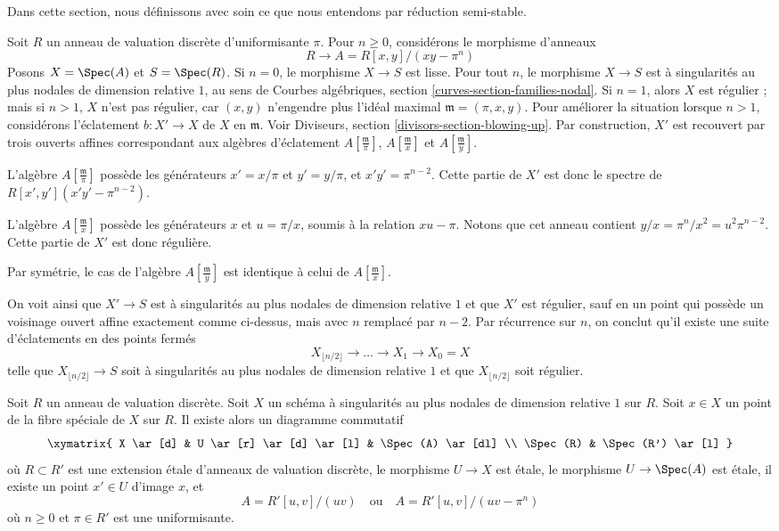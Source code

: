 \noindent
Dans cette section, nous définissons avec soin ce que nous entendons par
réduction semi-stable.

\begin{example}
\label{example-blowup}
Soit $R$ un anneau de valuation discrète d'uniformisante $\pi$.
Pour $n\geq0$, considérons le morphisme d'anneaux
$$
R \longrightarrow A = R[x, y]/(xy - \pi^n)
$$
Posons $X=\Spec(A)$ et $S=\Spec(R)$. Si $n=0$, le morphisme
$X\to S$ est lisse. Pour tout $n$, le morphisme $X\to S$ est à
singularités au plus nodales de dimension relative $1$, au sens de Courbes
algébriques, section \ref{curves-section-families-nodal}. Si $n=1$, alors
$X$ est régulier ; mais si $n>1$, $X$ n'est pas régulier, car $(x,y)$
n'engendre plus l'idéal maximal $\mathfrak m=(\pi,x,y)$. Pour améliorer la
situation lorsque $n>1$, considérons l'éclatement
$b:X'\to X$ de $X$ en $\mathfrak m$. Voir Diviseurs, section
\ref{divisors-section-blowing-up}. Par construction, $X'$ est recouvert par
trois ouverts affines correspondant aux algèbres d'éclatement
$A[\frac{\mathfrak m}{\pi}]$, $A[\frac{\mathfrak m}{x}]$ et
$A[\frac{\mathfrak m}{y}]$.

\medskip\noindent
L'algèbre $A[\frac{\mathfrak m}{\pi}]$ possède les générateurs
$x'=x/\pi$ et $y'=y/\pi$, et $x'y'=\pi^{n-2}$. Cette partie de $X'$ est
donc le spectre de $R[x',y'](x'y'-\pi^{n-2})$.

\medskip\noindent
L'algèbre $A[\frac{\mathfrak m}{x}]$ possède les générateurs $x$ et
$u=\pi/x$, soumis à la relation $xu-\pi$. Notons que cet anneau contient
$y/x=\pi^n/x^2=u^2\pi^{n-2}$. Cette partie de $X'$ est donc régulière.

\medskip\noindent
Par symétrie, le cas de l'algèbre $A[\frac{\mathfrak m}{y}]$ est identique
à celui de $A[\frac{\mathfrak m}{x}]$.

\medskip\noindent
On voit ainsi que $X'\to S$ est à singularités au plus nodales de dimension
relative $1$ et que $X'$ est régulier, sauf en un point qui possède un
voisinage ouvert affine exactement comme ci-dessus, mais avec $n$ remplacé
par $n-2$. Par récurrence sur $n$, on conclut qu'il existe une suite
d'éclatements en des points fermés
$$
X_{\lfloor n/2 \rfloor} \to \ldots \to X_1 \to X_0 = X
$$
telle que $X_{\lfloor n/2 \rfloor}\to S$ soit à singularités au plus
nodales de dimension relative $1$ et que
$X_{\lfloor n/2 \rfloor}$ soit régulier.
\end{example}

\begin{lemma}
\label{lemma-etale-local-at-worst-nodal}
Soit $R$ un anneau de valuation discrète. Soit $X$ un schéma à singularités
au plus nodales de dimension relative $1$ sur $R$. Soit $x\in X$ un point
de la fibre spéciale de $X$ sur $R$. Il existe alors un diagramme commutatif
$$
\xymatrix{
X \ar[d] &
U \ar[r] \ar[d] \ar[l] &
\Spec(A) \ar[dl] \\
\Spec(R) &
\Spec(R') \ar[l]
}
$$
où $R\subset R'$ est une extension étale d'anneaux de valuation discrète,
le morphisme $U\to X$ est étale, le morphisme $U\to\Spec(A)$ est étale,
il existe un point $x'\in U$ d'image $x$, et
$$
A = R'[u, v]/(uv)
\quad\text{ou}\quad
A = R'[u, v]/(uv - \pi^n)
$$
où $n\geq0$ et $\pi\in R'$ est une uniformisante.
\end{lemma}

